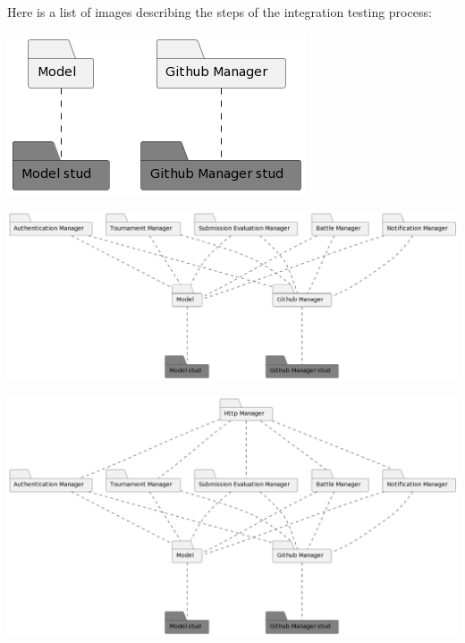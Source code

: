 \documentclass{article}
\begin{document}
Here is a list of images describing the steps of the integration testing process:\\

\begin{center}
    \includegraphics[width=0.3\linewidth]{its1.png}
  \label{fig:its1}
\end{center}

\begin{center}
    \includegraphics[width=\linewidth]{its2.png}
  \label{fig:its2}
\end{center}

\begin{center}
    \includegraphics[width=\linewidth]{its3.png}
  \label{fig:its3}
\end{center}
\end{document}
